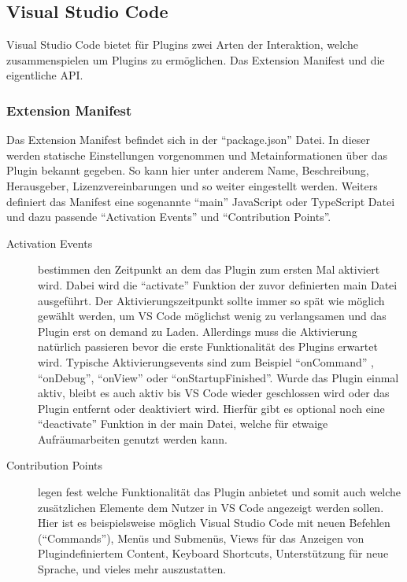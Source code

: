 \subsection{Visual Studio Code}

Visual Studio Code bietet für Plugins zwei Arten der 
Interaktion, welche zusammenspielen um Plugins zu ermöglichen. 
Das Extension Manifest und die eigentliche API.
\subsubsection{Extension Manifest} 
  Das Extension Manifest befindet sich in der \enquote{package.json} 
  Datei. In dieser werden statische Einstellungen vorgenommen und
  Metainformationen über das Plugin bekannt gegeben. So kann hier unter
  anderem Name, Beschreibung, Herausgeber, Lizenzvereinbarungen und
  so weiter eingestellt werden. Weiters definiert das Manifest eine sogenannte
  \enquote{main} JavaScript oder TypeScript Datei und dazu passende
  \enquote{Activation Events} und \enquote{Contribution Points}.
  \begin{description}
    \item[Activation Events] bestimmen den Zeitpunkt an dem das Plugin zum ersten Mal
      aktiviert wird. Dabei wird die \enquote{activate} Funktion der zuvor definierten
      main Datei ausgeführt. Der Aktivierungszeitpunkt sollte immer so spät wie
      möglich gewählt werden, um VS Code möglichst wenig zu verlangsamen und
      das Plugin erst on demand zu Laden. Allerdings
      muss die Aktivierung natürlich passieren bevor die erste Funktionalität des
      Plugins erwartet wird. Typische Aktivierungsevents sind zum Beispiel \enquote{onCommand}
      , \enquote{onDebug}, \enquote{onView} oder \enquote{onStartupFinished}.
      Wurde das Plugin einmal aktiv, bleibt es auch aktiv bis VS Code wieder geschlossen
      wird oder das Plugin entfernt oder deaktiviert wird. Hierfür gibt es optional
      noch eine \enquote{deactivate} Funktion in der main Datei, welche für etwaige
      Aufräumarbeiten genutzt werden kann.
    \item[Contribution Points] legen fest welche Funktionalität das Plugin anbietet
      und somit auch welche zusätzlichen Elemente dem Nutzer in VS Code angezeigt werden sollen. %
      Hier ist es beispielsweise möglich Visual Studio Code mit neuen Befehlen (\enquote{Commands}),
      Menüs und Submenüs, Views für das Anzeigen von Plugindefiniertem Content,
      Keyboard Shortcuts, Unterstützung für neue Sprache, und vieles mehr auszustatten.
  \end{description}
